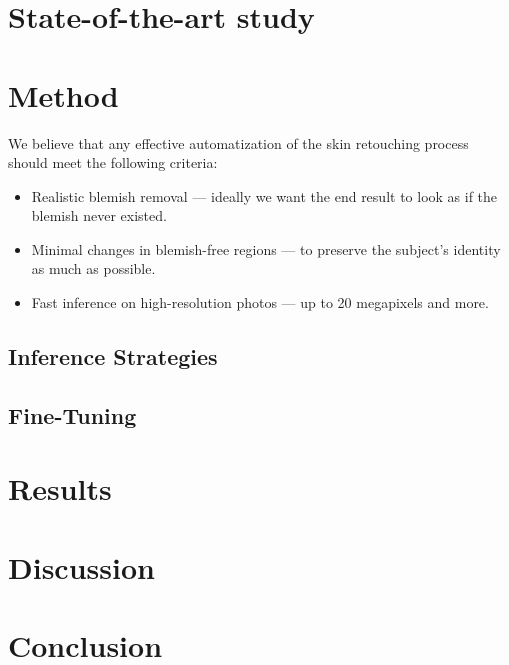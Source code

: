 \documentclass[11pt,a4paper]{article}
\begin{document}
\section{State-of-the-art study}

\section{Method}
We believe that any effective automatization of the skin retouching process should meet the following criteria:
\begin{itemize}
    \item Realistic blemish removal --- ideally we want the end result to look as if the blemish never existed.
    \item Minimal changes in blemish-free regions --- to preserve the subject's identity as much as possible.
    \item Fast inference on high-resolution photos --- up to 20 megapixels and more.
\end{itemize}

\subsection{Inference Strategies}

\subsection{Fine-Tuning}

\section{Results}

\section{Discussion}

\section{Conclusion}

\printbibliography
\end{document}
